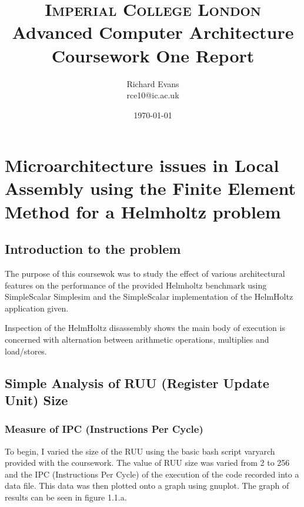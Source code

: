 \documentclass[paper=a4, fontsize=11pt]{scrartcl} %
\title{	
\normalfont \normalsize 
\textsc{Imperial College London} \\ [20pt] %
\huge Advanced Computer Architecture Coursework One Report \\ %
}
\author{Richard Evans\\ rce10@ic.ac.uk} %
\date{\normalsize\today} %
\numberwithin{equation}{section} %
\numberwithin{figure}{section} %
\numberwithin{table}{section} %
\begin{document}
\maketitle %

\section{Microarchitecture issues in Local Assembly using the Finite Element Method for a Helmholtz problem}

\subsection{Introduction to the problem}

The purpose of this coursewok was to study the effect of various architectural features on the performance of the provided Helmholtz benchmark using SimpleScalar Simplesim and the SimpleScalar implementation of the HelmHoltz application given.

Inspection of the HelmHoltz disassembly shows the main body of execution is concerned with alternation between arithmetic operations, multiplies and load/stores.

\subsection{Simple Analysis of RUU (Register Update Unit) Size}

\subsubsection{Measure of IPC (Instructions Per Cycle)}

To begin, I varied the size of the RUU using the basic bash script varyarch provided with the coursework.  The value of RUU size was varied from 2 to 256 and the IPC (Instructions Per Cycle) of the execution of the code recorded into a data file.  This data was then plotted onto a graph using gnuplot.  The graph of results can be seen in figure 1.1.a.
\end{document}
